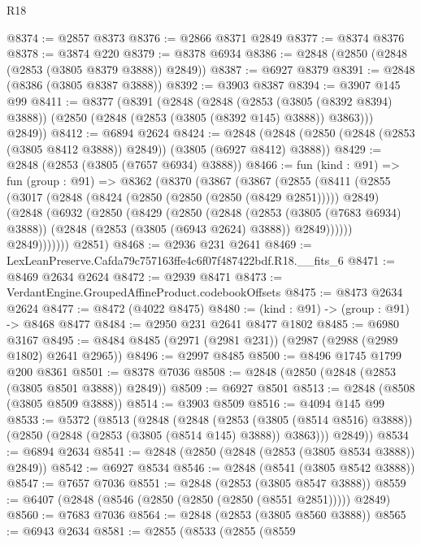 \begin{lexlean}{R18}
\begin{coremodule}
@8374 := @2857 @8373
@8376 := @2866 @8371 @2849
@8377 := @8374 @8376
@8378 := @3874 @220
@8379 := @8378 @6934
@8386 := @2848 (@2850 (@2848 (@2853 (@3805 @8379 @3888)) @2849))
@8387 := @6927 @8379
@8391 := @2848 (@8386 (@3805 @8387 @3888))
@8392 := @3903 @8387
@8394 := @3907 @145 @99
@8411 := @8377
    (@8391
      (@2848
        (@2848
          (@2853 (@3805 (@8392 @8394) @3888))
          (@2850 (@2848 (@2853 (@3805 (@8392 @145) @3888)) @3863)))
        @2849))
@8412 := @6894 @2624
@8424 := @2848 (@2848 (@2850 (@2848 (@2853 (@3805 @8412 @3888)) @2849)) (@3805 (@6927 @8412) @3888))
@8429 := @2848 (@2853 (@3805 (@7657 @6934) @3888))
@8466 := fun (kind : @91) =>
  fun (group : @91) =>
  @8362
    (@8370
      (@3867
        (@3867
          (@2855
            (@8411
              (@2855
                (@3017
                  (@2848 (@8424 (@2850 (@2850 (@2850 (@8429 @2851))))) @2849)
                  (@2848
                    (@6932
                      (@2850
                        (@8429
                          (@2850
                            (@2848
                              (@2853 (@3805 (@7683 @6934) @3888))
                              (@2848 (@2853 (@3805 (@6943 @2624) @3888)) @2849))))))
                    @2849)))))))
      @2851)
@8468 := @2936 @231 @2641
@8469 := LexLeanPreserve.Cafda79c757163ffe4c6f07f487422bdf.R18.__fits_6
@8471 := @8469 @2634 @2624
@8472 := @2939 @8471
@8473 := VerdantEngine.GroupedAffineProduct.codebookOffsets
@8475 := @8473 @2634 @2624
@8477 := @8472 (@4022 @8475)
@8480 := (kind : @91) -> (group : @91) -> @8468 @8477
@8484 := @2950 @231 @2641 @8477 @1802
@8485 := @6980 @3167
@8495 := @8484 @8485 (@2971 (@2981 @231)) (@2987 (@2988 (@2989 @1802) @2641 @2965))
@8496 := @2997 @8485
@8500 := @8496 @1745 @1799 @200 @8361
@8501 := @8378 @7036
@8508 := @2848 (@2850 (@2848 (@2853 (@3805 @8501 @3888)) @2849))
@8509 := @6927 @8501
@8513 := @2848 (@8508 (@3805 @8509 @3888))
@8514 := @3903 @8509
@8516 := @4094 @145 @99
@8533 := @5372
    (@8513
      (@2848
        (@2848
          (@2853 (@3805 (@8514 @8516) @3888))
          (@2850 (@2848 (@2853 (@3805 (@8514 @145) @3888)) @3863)))
        @2849))
@8534 := @6894 @2634
@8541 := @2848 (@2850 (@2848 (@2853 (@3805 @8534 @3888)) @2849))
@8542 := @6927 @8534
@8546 := @2848 (@8541 (@3805 @8542 @3888))
@8547 := @7657 @7036
@8551 := @2848 (@2853 (@3805 @8547 @3888))
@8559 := @6407 (@2848 (@8546 (@2850 (@2850 (@2850 (@8551 @2851))))) @2849)
@8560 := @7683 @7036
@8564 := @2848 (@2853 (@3805 @8560 @3888))
@8565 := @6943 @2634
@8581 := @2855
    (@8533
      (@2855
        (@8559

\end{coremodule}
\end{lexlean}
